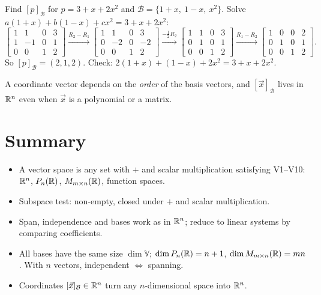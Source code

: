 \begin{example}
Find $[p]_{\mathcal B}$ for $p=3+x+2x^2$ and $\mathcal B=\{1+x,\ 1-x,\ x^2\}$. Solve
$a(1+x)+b(1-x)+cx^2=3+x+2x^2$:
\[
\left[\begin{array}{ccc|c}1&1&0&3\\1&-1&0&1\\0&0&1&2\end{array}\right]
\xrightarrow{R_2-R_1}
\left[\begin{array}{ccc|c}1&1&0&3\\0&-2&0&-2\\0&0&1&2\end{array}\right]
\xrightarrow{-\frac12R_2}
\left[\begin{array}{ccc|c}1&1&0&3\\0&1&0&1\\0&0&1&2\end{array}\right]
\xrightarrow{R_1-R_2}
\left[\begin{array}{ccc|c}1&0&0&2\\0&1&0&1\\0&0&1&2\end{array}\right].
\]
So $[p]_{\mathcal B}=(2,1,2)$. Check: $2(1+x)+(1-x)+2x^2=3+x+2x^2$.
\end{example}

\begin{important}[Pitfall]
A coordinate vector depends on the \emph{order} of the basis vectors, and $[\vec x]_{\mathcal B}$ lives in $\mathbb{R}^n$
even when $\vec x$ is a polynomial or a matrix.
\end{important}

\section*{Summary}
\begin{itemize}
  \item A vector space is any set with $+$ and scalar multiplication satisfying V1--V10: $\mathbb{R}^n$, $P_{n}(\mathbb{R})$,
        $M_{m\times n}(\mathbb{R})$, function spaces.
  \item Subspace test: non-empty, closed under $+$ and scalar multiplication.
  \item Span, independence and bases work as in $\mathbb{R}^n$; reduce to linear systems by comparing coefficients.
  \item All bases have the same size $\dim\mathbb V$; $\dim P_{n}(\mathbb{R})=n+1$, $\dim M_{m\times n}(\mathbb{R})=mn$. With $n$ vectors,
        independent $\iff$ spanning.
  \item Coordinates $[\vec x]_{\mathcal B}\in\mathbb{R}^n$ turn any $n$-dimensional space into $\mathbb{R}^n$.
\end{itemize}
